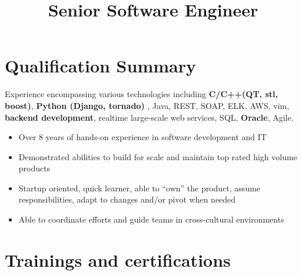 \documentclass[11pt,a4paper]{moderncv}
\title{Senior Software Engineer}        %
\begin{document}
\maketitle

\section{Qualification Summary}
Experience encompassing various technologies including \textbf{C/C++(QT, stl, boost)}, \textbf{Python (Django, tornado) }, Java, REST, SOAP, ELK, AWS, vim, \textbf{backend development}, realtime large-scale web services, SQL, \textbf{Oracle}, Agile.

\begin{itemize}
    \item Over 8 years of hands-on experience in software development and IT
    \item Demonstrated abilities to build for scale and maintain top rated high volume products
    \item Startup oriented, quick learner, able to “own” the product, assume responsibilities, adapt to changes and/or pivot when needed 
    \item Able to coordinate efforts and guide teams in cross-cultural environments
\end{itemize}

\section{Trainings and certifications}
\end{document}
